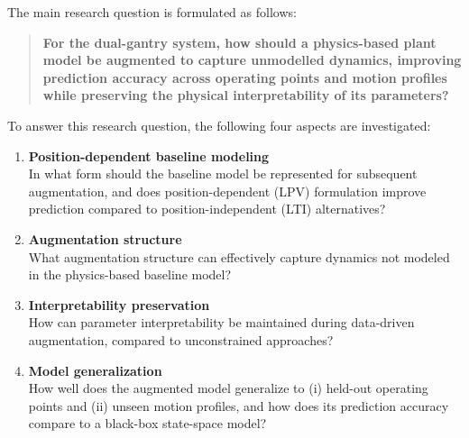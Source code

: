 \noindent The main research question is formulated as follows:
\begin{quote}
\textbf{For the dual-gantry system, how should a physics-based plant model be augmented to capture unmodelled dynamics, improving prediction accuracy across operating points and motion profiles while preserving the physical interpretability of its parameters?}
\end{quote}
\noindent To answer this research question, the following four aspects are investigated:
\begin{enumerate}
    \item \textbf{Position-dependent baseline modeling} \\
    In what form should the baseline model be represented for subsequent augmentation, and does position-dependent (LPV) formulation improve prediction compared to position-independent (LTI) alternatives? 
    \item \textbf{Augmentation structure} \\
    What augmentation structure can effectively capture dynamics not modeled in the physics-based baseline model?
    \item \textbf{Interpretability preservation} \\
    How can parameter interpretability be maintained during data-driven augmentation, compared to unconstrained approaches?
    \item \textbf{Model generalization} \\
    How well does the augmented model generalize to (i) held-out operating points and (ii) unseen motion profiles, and how does its prediction accuracy compare to a black-box state-space model? 
\end{enumerate}

